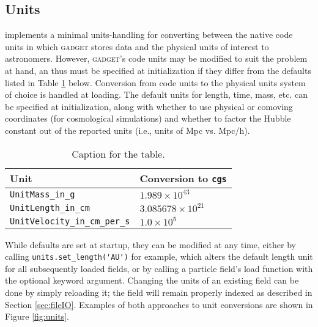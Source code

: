 \subsection{Units}
\label{sec:units}
 implements a minimal units-handling for converting between the native code units in which \textsc{gadget} stores data and the physical units of interest to astronomers.  
However, \textsc{gadget}'s code units may be modified to suit the problem at hand, an thus must be specified at  initialization if they differ from the defaults listed in Table \ref{code_unit_defaults} below.
Conversion from code units to the physical units system of choice is handled at loading.
The default units for length, time, mass, etc. can be specified at initialization, along with whether to use physical or comoving coordinates (for cosmological simulations) and whether to factor the Hubble constant out of the reported units (i.e., units of Mpc vs. Mpc/h).

\begin{table}[h!]
    \begin{tabular}{ll}
     \centering
      \caption{Caption for the table.}
      \label{code_unit_defaults}
        \toprule 
        Unit & Conversion to \verb|cgs|\\
        \midrule
        \verb|UnitMass_in_g| &  $1.989\times10^{43}$\\ 
        \verb|UnitLength_in_cm| & $3.085678\times10^{21}$ \\ 
        \verb|UnitVelocity_in_cm_per_s| & $1.0\times10^5$ \\ 
        \bottomrule
    \end{tabular} 
\end{table}

While defaults are set at startup, they can be modified at any time, either by calling \verb|units.set_length('AU')| for example, which alters the default length unit for all subsequently loaded fields, or by calling a particle field's load function with the optional  keyword argument.  
Changing the units of an existing field can be done by simply reloading it; the field will remain properly indexed as described in Section \ref{sec:fileIO}. Examples of both approaches to unit conversions are shown in Figure \ref{fig:units}.